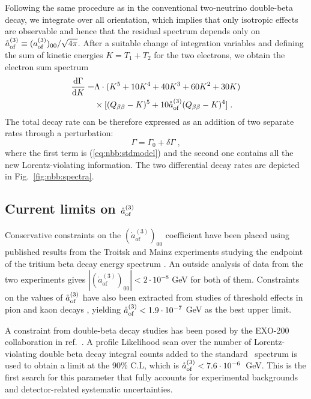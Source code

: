 Following the same procedure as in the conventional two-neutrino double-beta
decay, we integrate over all orientation, which implies that only isotropic
effects are observable and hence that the residual spectrum depends only on
$\mathring{a}_\text{of}^{(3)}\equiv(a_\text{of}^{(3)})_{00}/\sqrt{4\pi}$. After a suitable change of
integration variables and defining the sum of kinetic energies $K=T_1+T_2$ for
the two electrons, we obtain the electron sum spectrum
\begin{equation}\label{eq:nbb:totwidth}
  \begin{split}
    \frac{\text{d}\Gamma}{\text{d}K} =&
      \Lambda \cdot(K^5+10K^4+40K^3+60K^2+30K) \\
      & \times[(Q_{\beta\beta}-K)^5+10\mathring{a}_\text{of}^{(3)}(Q_{\beta\beta}-K)^4] \;. \\
  \end{split}
\end{equation}
The total decay rate can be therefore expressed as an addition of two separate
rates through a perturbation:
\begin{equation}
  \Gamma = \Gamma_0+\delta\Gamma \;,
\end{equation}
where the first term is (\ref{eq:nbb:stdmodel}) and the second one contains all the
new Lorentz-violating information. The two differential decay rates are
depicted in Fig.~\ref{fig:nbb:spectra}.

\subsection{Current limits on $\mathring{a}_\text{of}^{(3)}$}
Conservative constraints on the $(\mathring{a}^{(3)}_\text{of})_{00}$
coefficient have been placed using published results from the Troitsk and Mainz
experiments studying the endpoint of the tritium beta decay energy spectrum
\cite{Diaz:2013saa}. An outside analysis of data from the two experiments gives
$|(\mathring{a}^{(3)}_\text{of})_{00}|<2\cdot10^{-8}$ GeV for both of them.
Constraints on the values of $\mathring{a}_\text{of}^{(3)}$ have also been extracted from studies of
threshold effects in pion and kaon decays \cite{SMEneutrinos}, yielding
$\mathring{a}_\text{of}^{(3)}<1.9\cdot10^{-7}$ GeV as the best upper limit.

A constraint from double-beta decay studies has been posed by the EXO-200
collaboration in ref.~\cite{exo200}. A profile Likelihood scan over the number
of Lorentz-violating double beta decay integral counts added to the standard
\nnbb\ spectrum is used to obtain a limit at the 90\% C.L, which is
$\mathring{a}_\text{of}^{(3)}<7.6\cdot10^{-6}$~GeV. This is the first search for this parameter that
fully accounts for experimental backgrounds and detector-related systematic
uncertainties.
